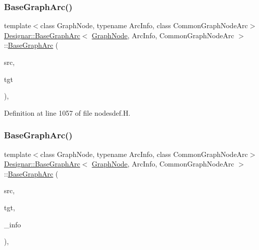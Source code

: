 \subsubsection{\texorpdfstring{Base\+Graph\+Arc()}{BaseGraphArc()}\hspace{0.1cm}{\footnotesize\ttfamily [2/4]}}
{\footnotesize\ttfamily template$<$class Graph\+Node, typename Arc\+Info, class Common\+Graph\+Node\+Arc$>$ \\
\hyperlink{class_designar_1_1_base_graph_arc}{Designar\+::\+Base\+Graph\+Arc}$<$ \hyperlink{class_designar_1_1_graph_node}{Graph\+Node}, Arc\+Info, Common\+Graph\+Node\+Arc $>$\+::\hyperlink{class_designar_1_1_base_graph_arc}{Base\+Graph\+Arc} (\begin{DoxyParamCaption}\item[{\hyperlink{class_designar_1_1_graph_node}{Graph\+Node} $\ast$}]{src,  }\item[{\hyperlink{class_designar_1_1_graph_node}{Graph\+Node} $\ast$}]{tgt }\end{DoxyParamCaption})\hspace{0.3cm}{\ttfamily [inline]}, {\ttfamily [protected]}}



Definition at line 1057 of file nodesdef.\+H.

\mbox{\label{class_designar_1_1_base_graph_arc_a013c1af0c1aadf28260b33585308f7ac}} 
\subsubsection{\texorpdfstring{Base\+Graph\+Arc()}{BaseGraphArc()}\hspace{0.1cm}{\footnotesize\ttfamily [3/4]}}
{\footnotesize\ttfamily template$<$class Graph\+Node, typename Arc\+Info, class Common\+Graph\+Node\+Arc$>$ \\
\hyperlink{class_designar_1_1_base_graph_arc}{Designar\+::\+Base\+Graph\+Arc}$<$ \hyperlink{class_designar_1_1_graph_node}{Graph\+Node}, Arc\+Info, Common\+Graph\+Node\+Arc $>$\+::\hyperlink{class_designar_1_1_base_graph_arc}{Base\+Graph\+Arc} (\begin{DoxyParamCaption}\item[{\hyperlink{class_designar_1_1_graph_node}{Graph\+Node} $\ast$}]{src,  }\item[{\hyperlink{class_designar_1_1_graph_node}{Graph\+Node} $\ast$}]{tgt,  }\item[{const Arc\+Info \&}]{\+\_\+info }\end{DoxyParamCaption})\hspace{0.3cm}{\ttfamily [inline]}, {\ttfamily [protected]}}



